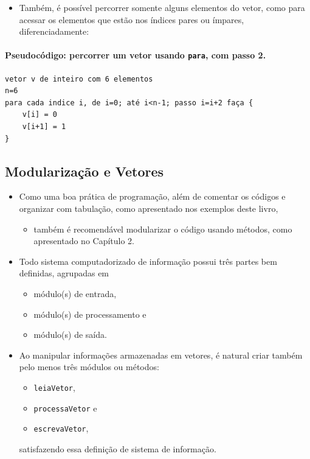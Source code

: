 \documentclass[12pt,a4paper]{article}
\providecommand{\tightlist}{%
      \setlength{\itemsep}{0pt}\setlength{\parskip}{0pt}}
\begin{document}
    \begin{itemize}
\tightlist
\item
  Também, é possível percorrer somente alguns elementos do vetor, como
  para acessar os elementos que estão nos índices pares ou ímpares,
  diferenciadamente:
\end{itemize}

    \hypertarget{pseudocuxf3digo-percorrer-um-vetor-usando-para-com-passo-2.}{%
\paragraph{\texorpdfstring{Pseudocódigo: percorrer um vetor usando
\texttt{para}, com passo
2.}{Pseudocódigo: percorrer um vetor usando para, com passo 2.}}\label{pseudocuxf3digo-percorrer-um-vetor-usando-para-com-passo-2.}}

    \begin{verbatim}
vetor v de inteiro com 6 elementos
n=6
para cada indice i, de i=0; até i<n-1; passo i=i+2 faça {
    v[i] = 0
    v[i+1] = 1
}
\end{verbatim}

    \hypertarget{modularizauxe7uxe3o-e-vetores}{%
\subsection{Modularização e
Vetores}\label{modularizauxe7uxe3o-e-vetores}}

    \begin{itemize}
\tightlist
\item
  Como uma boa prática de programação, além de comentar os códigos e
  organizar com tabulação, como apresentado nos exemplos deste livro,

  \begin{itemize}
  \tightlist
  \item
    também é recomendável modularizar o código usando métodos, como
    apresentado no Capítulo 2.
  \end{itemize}
\item
  Todo sistema computadorizado de informação possui três partes bem
  definidas, agrupadas em

  \begin{itemize}
  \tightlist
  \item
    módulo(s) de entrada,
  \item
    módulo(s) de processamento e
  \item
    módulo(s) de saída.
  \end{itemize}
\item
  Ao manipular informações armazenadas em vetores, é natural criar
  também pelo menos três módulos ou métodos:

  \begin{itemize}
  \tightlist
  \item
    \texttt{leiaVetor},
  \item
    \texttt{processaVetor} e
  \item
    \texttt{escrevaVetor},
  \end{itemize}

  satisfazendo essa definição de sistema de informação.
\end{itemize}
\end{document}

